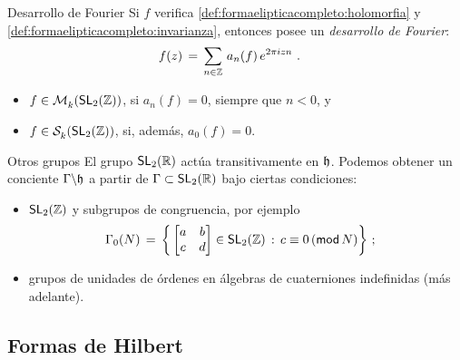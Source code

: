 \begin{frame}{Desarrollo de Fourier}
	Si $f$ verifica \ref{def:formaelipticacompleto:holomorfia} y
	\ref{def:formaelipticacompleto:invarianza}, entonces posee un
	\emph{desarrollo de Fourier}:
	\begin{align*}
		f(z) & \,=\,\sum_{n\in\bb{Z}}\,a_{n}(f)\,e^{2\pi i z n}
		\text{ .}
	\end{align*}
	\begin{itemize}
		\item $f\in\modular{k}{\SL[2](\bb{Z})}$, si $a_{n}(f)=0$,
			siempre que $n<0$, y
		\item $f\in\spitz{k}{\SL[2](\bb{Z})}$, si, adem\'{a}s,
			$a_{0}(f)=0$.
	\end{itemize}
\end{frame}

\begin{frame}{Otros grupos}
	El grupo $\SL[2](\bb R)$ act\'{u}a transitivamente en $\hP$. Podemos
	obtener un conciente $\Gamma\backslash\hP$ a partir de
	$\Gamma\subset\SL[2](\bb R)$ bajo ciertas condiciones:
	\begin{itemize}
		\item $\SL[2](\bb{Z})$ y subgrupos de congruencia, por ejemplo
			\begin{align*}
				\Gamma_{0}(N) & \,=\,\bigg\{
					\begin{bmatrix} a & b \\
					c & d \end{bmatrix}\in\SL[2](\bb{Z})
					\,:\,c\equiv 0\,(\modulo\,N)\bigg\}
				\text{ ;}
			\end{align*}
		\item grupos de unidades de \'{o}rdenes en \'{a}lgebras de
			cuaterniones indefinidas (m\'{a}s adelante).
	\end{itemize}
\end{frame}


\subsection{Formas de Hilbert}

